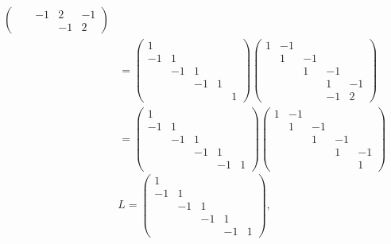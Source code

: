 \documentclass[a4paper,11pt]{article}
\begin{document}
\begin{enumerate}
\begin{align*}
\begin{pmatrix}
                &  & -1 & 2 & -1 \\
                &  &  & -1 & 2
             \end{pmatrix} \\
          &= \begin{pmatrix}
               1 &  &  &  &  \\
               -1 & 1 &  &  &  \\
                & -1 & 1 &  &  \\
                &  & -1 & 1 &  \\
                &  &  &  & 1
             \end{pmatrix}
             \begin{pmatrix}
               1 & -1 &  &  &  \\
                & 1 & -1 &  &  \\
                &  & 1 & -1 &  \\
                &  &  & 1 & -1 \\
                &  &  & -1 & 2
             \end{pmatrix} \\
          &= \begin{pmatrix}
               1 &  &  &  &  \\
               -1 & 1 &  &  &  \\
                & -1 & 1 &  &  \\
                &  & -1 & 1 &  \\
                &  &  & -1 & 1
             \end{pmatrix}
             \begin{pmatrix}
               1 & -1 &  &  &  \\
                & 1 & -1 &  &  \\
                &  & 1 & -1 &  \\
                &  &  & 1 & -1 \\
                &  &  &  & 1
             \end{pmatrix} 
      \end{align*}
      $$ L = \begin{pmatrix}
               1 &  &  &  &  \\
               -1 & 1 &  &  &  \\
                & -1 & 1 &  &  \\
                &  & -1 & 1 &  \\
                &  &  & -1 & 1
             \end{pmatrix},
$$
\end{enumerate}
\end{document}
